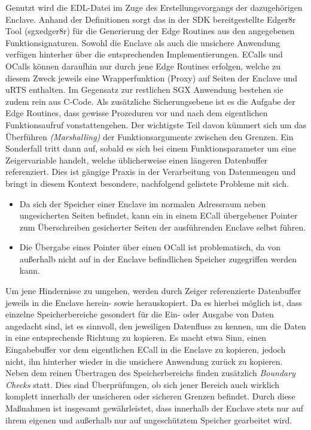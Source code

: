 Genutzt wird die EDL-Datei im Zuge des Erstellungsvorgangs der dazugehörigen Enclave. Anhand der Definitionen sorgt das in der SDK bereitgestellte Edger8r Tool (sgx\textunderscore edger8r) für die Generierung der Edge Routines aus den angegebenen Funktionsignaturen. Sowohl die Enclave als auch die unsichere Anwendung verfügen hinterher über die entsprechenden Implementierungen. \acp{ECall} und \acp{OCall} können daraufhin nur durch jene Edge Routines erfolgen, welche zu diesem Zweck jeweils eine Wrapperfunktion (Proxy) auf Seiten der Enclave und uRTS enthalten. Im Gegensatz zur restlichen \ac{SGX} Anwendung bestehen sie zudem rein aus C-Code. Als zusätzliche Sicherungsebene ist es die Aufgabe der Edge Routines, dass gewisse Prozeduren vor und nach dem eigentlichen Funktionsaufruf vonstattengehen. Der wichtigste Teil davon kümmert sich um das Überführen \textit{(Marshalling)} der Funktionsargumente zwischen den Grenzen. Ein Sonderfall tritt dann auf, sobald es sich bei einem Funktionsparameter um eine Zeigervariable handelt, welche üblicherweise einen längeren Datenbuffer referenziert. Dies ist gängige Praxis in der Verarbeitung von Datenmengen und bringt in diesem Kontext besondere, nachfolgend gelistete Probleme mit sich.

\begin{itemize}
	\item Da sich der Speicher einer Enclave im normalen Adressraum neben ungesicherten Seiten befindet, kann ein in einem \ac{ECall} übergebener Pointer zum Überschreiben gesicherter Seiten der ausführenden Enclave selbst führen.
	\item Die Übergabe eines Pointer über einen \ac{OCall} ist problematisch, da von außerhalb nicht auf in der Enclave befindlichen Speicher zugegriffen werden kann.
\end{itemize}

Um jene Hindernisse zu umgehen, werden durch Zeiger referenzierte Datenbuffer jeweils in die Enclave herein- sowie herauskopiert. Da es hierbei möglich ist, dass einzelne Speicherbereiche gesondert für die Ein- oder Ausgabe von Daten angedacht sind, ist es sinnvoll, den jeweiligen Datenfluss zu kennen, um die Daten in eine entsprechende Richtung zu kopieren. Es macht etwa Sinn, einen Eingabebuffer vor dem eigentlichen \ac{ECall} in die Enclave zu kopieren, jedoch nicht, ihn hinterher wieder in die unsichere Anwendung  zurück zu kopieren. Neben dem reinen Übertragen des Speicherbereichs finden zusätzlich \textit{Boundary Checks} statt. Dies sind Überprüfungen, ob sich jener Bereich auch wirklich komplett innerhalb der unsicheren oder sicheren Grenzen befindet. Durch diese Maßnahmen ist insgesamt gewährleistet, dass innerhalb der Enclave stets nur auf ihrem eigenen und außerhalb nur auf ungeschütztem Speicher gearbeitet wird.

